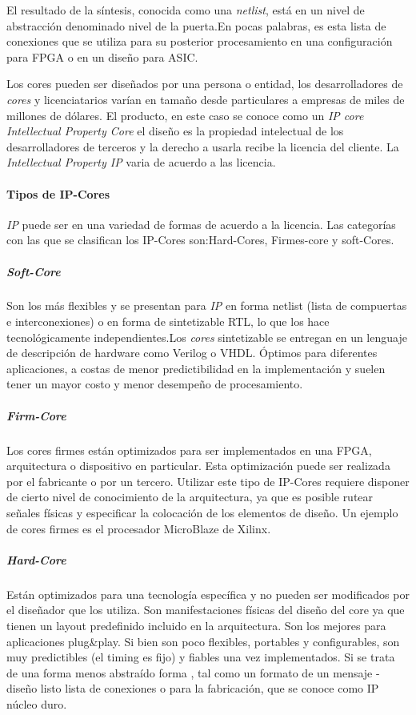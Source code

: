 El resultado de la síntesis, conocida como una \textit{netlist}, está en un nivel de abstracción denominado nivel de la puerta.En pocas palabras, es esta lista de conexiones que se utiliza para su posterior procesamiento en una configuración para FPGA o en un diseño para ASIC.

Los cores pueden ser diseñados por una persona o entidad, los desarrolladores de \textit{cores} y licenciatarios varían en tamaño desde particulares a empresas de miles de millones de dólares. El producto, en este caso se conoce como un \textit{IP core  Intellectual Property Core} el diseño es la propiedad intelectual de los desarrolladores de terceros y la derecho a usarla recibe la licencia del cliente. La \textit{Intellectual Property IP} varia  de  acuerdo a las licencia.

		\paragraph{Tipos de IP-Cores}

\textit{IP} puede ser en una variedad de formas de acuerdo a la licencia. Las categorías con las que se clasifican los IP-Cores son:Hard-Cores, Firmes-core y soft-Cores.
		
			\subparagraph{Soft-Core}

Son los más flexibles y se presentan para \textit{IP} en forma netlist (lista de compuertas e interconexiones) o en forma de sintetizable RTL, lo que los hace tecnológicamente independientes.Los \textit{cores} sintetizable se entregan en un lenguaje de descripción de hardware como Verilog o VHDL. 
 Óptimos para diferentes aplicaciones, a costas de menor predictibilidad en la implementación y suelen tener un mayor costo y menor desempeño de procesamiento.

			\subparagraph{Firm-Core}

Los cores firmes están optimizados para ser implementados en una FPGA, arquitectura o dispositivo en particular. Esta optimización puede ser realizada por el fabricante o por un tercero. Utilizar este tipo de IP-Cores requiere disponer de cierto nivel de conocimiento de la arquitectura, ya que es posible rutear señales físicas y especificar la colocación de los elementos de diseño. Un ejemplo de cores firmes es el procesador MicroBlaze de Xilinx.\cite{Etiqueta04}

			\subparagraph{Hard-Core}

Están optimizados para una tecnología específica y no pueden ser modificados por el diseñador que los utiliza. Son manifestaciones físicas del diseño del core ya que tienen un layout predefinido incluido en la arquitectura. Son los mejores para aplicaciones plug\&play. Si bien son poco flexibles, portables y configurables, son muy predictibles (el timing es fijo) y fiables una vez implementados.
Si se trata de una forma menos abstraído forma , tal como un formato de un mensaje - diseño listo lista de conexiones o para la fabricación, que se conoce como
IP núcleo duro. \cite{Etiqueta04}

